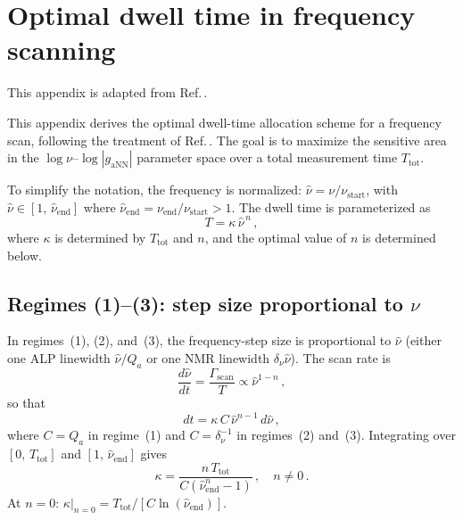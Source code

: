 \chapter{Optimal dwell time in frequency scanning}\label{app:dwell_time}
\begin{jointwork}
    This appendix is adapted from Ref.\,\cite{Yuzhe2023_FrequencyScanning}.
\end{jointwork}

This appendix derives the optimal dwell-time allocation scheme for a frequency scan, following the treatment of Ref.\,\cite{Yuzhe2023_FrequencyScanning}. The goal is to maximize the sensitive area in the $\log\nu$--$\log|g_{\mathrm{aNN}}|$ parameter space over a total measurement time $T_{\mathrm{tot}}$.

To simplify the notation, the frequency is normalized: $\hat{\nu} = \nu/\nu_{\mathrm{start}}$, with $\hat{\nu} \in [1,\,\hat{\nu}_{\mathrm{end}}]$ where $\hat{\nu}_{\mathrm{end}} = \nu_{\mathrm{end}}/\nu_{\mathrm{start}} > 1$. The dwell time is parameterized as
\begin{equation}
    T = \kappa\,\hat{\nu}^{\,n}
    \,,\label{eq:T_kappa_n}
\end{equation}
where $\kappa$ is determined by $T_{\mathrm{tot}}$ and $n$, and the optimal value of $n$ is determined below.

\section*{Regimes (1)--(3): step size proportional to $\nu$}

In regimes~(1), (2), and~(3), the frequency-step size is proportional to $\hat{\nu}$ (either one ALP linewidth $\hat{\nu}/Q_a$ or one NMR linewidth $\delta_\nu\hat{\nu}$). The scan rate is
\begin{equation}
    \dfrac{d\hat{\nu}}{dt} = \dfrac{\Gamma_{\mathrm{scan}}}{T} \propto \hat{\nu}^{1-n}
    \,,
\end{equation}
so that
\begin{equation}
    dt = \kappa\,C\,\hat{\nu}^{n-1}\,d\hat{\nu}
    \,,
\end{equation}
where $C = Q_a$ in regime~(1) and $C = \delta_\nu^{-1}$ in regimes~(2) and~(3). Integrating over $[0,\,T_{\mathrm{tot}}]$ and $[1,\,\hat{\nu}_{\mathrm{end}}]$ gives
\begin{equation}
    \kappa = \dfrac{n\,T_{\mathrm{tot}}}{C(\hat{\nu}_{\mathrm{end}}^{n}-1)}
    \,,\quad n \ne 0\,.
\end{equation}
At $n=0$: $\kappa|_{n=0} = T_{\mathrm{tot}}/[C\ln(\hat{\nu}_{\mathrm{end}})]$.

